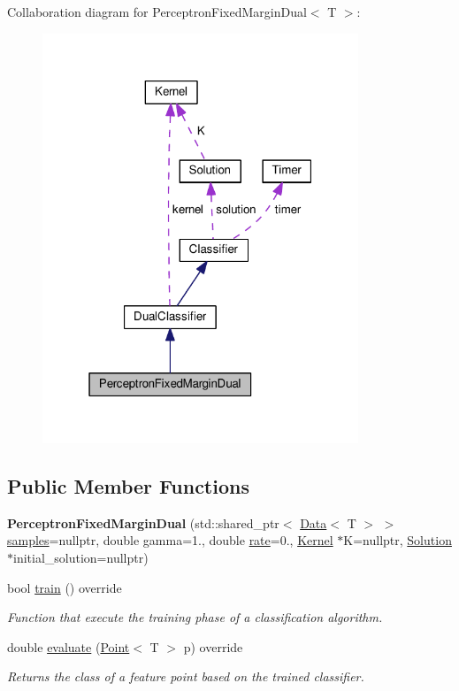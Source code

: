 Collaboration diagram for Perceptron\+Fixed\+Margin\+Dual$<$ T $>$\+:\nopagebreak
\begin{figure}[H]
\begin{center}
\leavevmode
\includegraphics[width=268pt]{class_perceptron_fixed_margin_dual__coll__graph}
\end{center}
\end{figure}
\subsection*{Public Member Functions}
\begin{DoxyCompactItemize}
\item 
\mbox{\label{class_perceptron_fixed_margin_dual_ac1397a3a17a88769befdf64f83573895}} 
{\bfseries Perceptron\+Fixed\+Margin\+Dual} (std\+::shared\+\_\+ptr$<$ \hyperlink{class_data}{Data}$<$ T $>$ $>$ \hyperlink{class_classifier_a0000b47a2e0784ada4c52d7046c4adb8}{samples}=nullptr, double gamma=1., double \hyperlink{class_classifier_a7b1c4ef87631bd9e46682e5bc4315111}{rate}=0., \hyperlink{class_kernel}{Kernel} $\ast$K=nullptr, \hyperlink{class_solution}{Solution} $\ast$initial\+\_\+solution=nullptr)
\item 
bool \hyperlink{class_perceptron_fixed_margin_dual_a58a5acdd6afaedff53fab23779f01486}{train} () override
\begin{DoxyCompactList}\small\item\em Function that execute the training phase of a classification algorithm. \end{DoxyCompactList}\item 
double \hyperlink{class_perceptron_fixed_margin_dual_acafabadf6d2552fde0bfb32f0344c6e3}{evaluate} (\hyperlink{class_point}{Point}$<$ T $>$ p) override
\begin{DoxyCompactList}\small\item\em Returns the class of a feature point based on the trained classifier. \end{DoxyCompactList}\end{DoxyCompactItemize}
